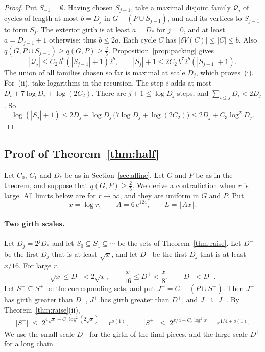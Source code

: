 \begin{proof}
Put $S_{-1}=\emptyset$.
Having chosen $S_{j-1}$, take a maximal disjoint family $\mathcal Q_j$ of cycles of length
at most $b=D_j$ in $G-(P\cup S_{j-1})$, and add its vertices to $S_{j-1}$ to form $S_j$.
The exterior girth is at least $a=D_*$ for $j=0$, and at least $a=D_{j-1}+1$ otherwise;
thus $b\le2a$.
Each cycle $C$ has $|\delta V(C)|\le|C|\le b$.
Also $q(G,P\cup S_{j-1})\ge q(G,P)\ge\frac25$.
Proposition~\ref{prop:packing} gives
\[
 |\mathcal Q_j|\le C_2\,b^{6}(|S_{j-1}|+1)2^b,
 \qquad |S_j|+1\le2C_2\,b^{7}2^b(|S_{j-1}|+1).
\]
The union of all families chosen so far is maximal at scale $D_j$, which proves~(i).
For~(ii), take logarithms in the recursion. The step $i$ adds at most
$D_i+7\log D_i+\log(2C_2)$. There are $j+1\le\log D_j$ steps, and $\sum_{i\le j}D_i<2D_j$. So
\[
 \log(|S_j|+1)\le2D_j+\log D_j\,\bigl(7\log D_j+\log(2C_2)\bigr)\le2D_j+C_3\log^{2}D_j .
\]
\end{proof}

\subsection{Proof of Theorem~\ref{thm:half}}\label{sec:halfproof}

Let $C_0$, $C_1$ and $D_*$ be as in Section~\ref{sec:affine}. Let $G$ and $P$ be as in the theorem, and
suppose that $q(G,P)\ge\frac25$. We derive a contradiction when $r$ is large. All limits below are
for $r\to\infty$, and they are uniform in $G$ and $P$. Put
\[
  x=\log r,\qquad A=6\,e^{124},\qquad L=\lfloor Ax\rfloor .
\]

\paragraph{Two girth scales.}
Let $D_j=2^{j}D_{*}$ and let $S_0\subseteq S_1\subseteq\cdots$ be the sets of
Theorem~\ref{thm:raise}. Let $D^{-}$ be the first $D_j$ that is at least $\sqrt x$, and let $D^{+}$
be the first $D_j$ that is at least $x/16$. For large $r$,
\[
  \sqrt x\le D^{-}<2\sqrt x,\qquad \frac x{16}\le D^{+}<\frac x8,\qquad D^{-}<D^{+}.
\]
Let $S^{-}\subseteq S^{+}$ be the corresponding sets, and put $J^{\pm}=G-(P\cup S^{\pm})$. Then
$J^{-}$ has girth greater than $D^{-}$, $J^{+}$ has girth greater than $D^{+}$, and
$J^{+}\subseteq J^{-}$. By Theorem~\ref{thm:raise}(ii),
\begin{equation}\label{eq:twosizes}
  |S^{-}|\;\le\;2^{4\sqrt x+C_3\log^{2}(2\sqrt x)}=r^{o(1)},\qquad
  |S^{+}|\;\le\;2^{x/4+C_3\log^{2}x}=r^{1/4+o(1)}.
\end{equation}
We use the small scale $D^{-}$ for the girth of the final pieces, and the large scale $D^{+}$
for a long chain.

